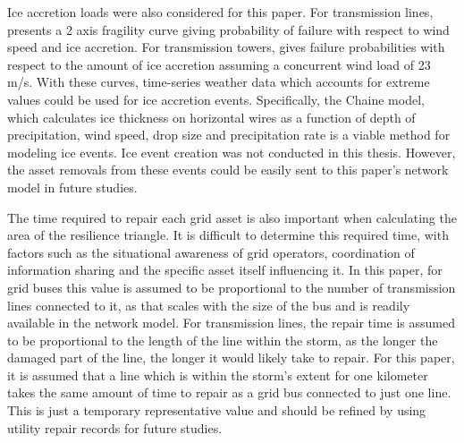 \documentclass[12pt]{article}
\begin{document}
Ice accretion loads were also considered for this paper. For transmission lines, \cite{Xiao2024} presents a 2 axis fragility curve giving probability of failure with respect to wind speed and ice accretion. For transmission towers, \cite{Rezaei} gives failure probabilities with respect to the amount of ice accretion assuming a concurrent wind load of 23 m/s. With these curves, time-series weather data which accounts for extreme values could be used for ice accretion events. Specifically, the Chaine model, which calculates ice thickness on horizontal wires as a function of depth of precipitation, wind speed, drop size and precipitation rate \cite{Sheng2023} is a viable method for modeling ice events. Ice event creation was not conducted in this thesis. However, the asset removals from these events could be easily sent to this paper’s network model in future studies. \par
The time required to repair each grid asset is also important when calculating the area of the resilience triangle. It is difficult to determine this required time, with factors such as the situational awareness of grid operators, coordination of information sharing and the specific asset itself \cite{panteli} influencing it. In this paper, for grid buses this value is assumed to be proportional to the number of transmission lines connected to it, as that scales with the size of the bus and is readily available in the network model. For transmission lines, the repair time is assumed to be proportional to the length of the line within the storm, as the longer the damaged part of the line, the longer it would likely take to repair. For this paper, it is assumed that a line which is within the storm’s extent for one kilometer takes the same amount of time to repair as a grid bus connected to just one line. This is just a temporary representative value and should be refined by using utility repair records for future studies.
\end{document}
